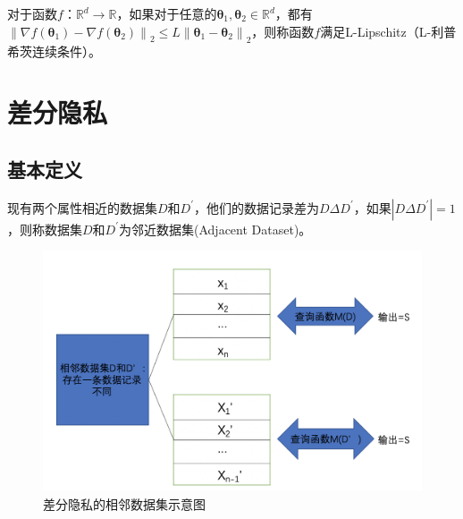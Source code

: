 \begin{define}\label{L-Lipschitz}
对于函数$f$：$\mathbb{R}^{d} \rightarrow \mathbb{R}$，如果对于任意的$\boldsymbol{\theta}_{1}, \boldsymbol{\theta}_{2} \in \mathbb{R}^{d}$，都有\\$\left\|\nabla f\left(\boldsymbol{\theta}_{1}\right)-\nabla f\left(\boldsymbol{\theta}_{2}\right)\right\|_{2} \leq L\left\|\boldsymbol{\theta}_{1}-\boldsymbol{\theta}_{2}\right\|_{2}$，则称函数$f$满足L-Lipschitz（L-利普希茨连续条件）。
\end{define}


\section{差分隐私}
\subsection{基本定义}
\begin{define}[邻近数据集]\label{邻近数据集}
现有两个属性相近的数据集$D$和$D^{\prime}$，他们的数据记录差为$D \Delta D^{\prime}$，如果$\left|D \Delta D^{\prime}\right|=1$，则称数据集$D$和$D^{\prime}$为邻近数据集(Adjacent Dataset)。
\end{define}

\begin{figure}[!hbt]
\centering
	\includegraphics[scale=0.6]{fig2/C2/相邻数据集示意图}%
	\caption{差分隐私的相邻数据集示意图}
	\label{fig:相邻数据集示意图}	
\end{figure}

